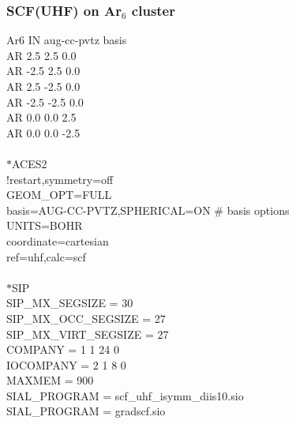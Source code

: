 \documentclass[12pt]{article}
\begin{document}
\subsubsection{SCF(UHF) on Ar$_6$ cluster} 
Ar6 IN aug-cc-pvtz basis\\ 
AR  2.5  2.5  0.0\\ 
AR -2.5  2.5  0.0\\ 
AR  2.5 -2.5  0.0\\ 
AR -2.5 -2.5  0.0\\ 
AR  0.0  0.0  2.5\\ 
AR  0.0  0.0 -2.5\\ 
\\ 
$*$ACES2\\ 
!restart,symmetry=off\\ 
GEOM\_OPT=FULL\\ 
basis=AUG-CC-PVTZ,SPHERICAL=ON \# basis options\\ 
UNITS=BOHR\\ 
coordinate=cartesian\\
ref=uhf,calc=scf\\ 
\\ 
$*$SIP\\ 
SIP\_MX\_SEGSIZE      = 30\\ 
SIP\_MX\_OCC\_SEGSIZE  = 27\\ 
SIP\_MX\_VIRT\_SEGSIZE = 27\\
COMPANY   = 1 1 24 0\\
IOCOMPANY = 2 1  8 0\\
MAXMEM    = 900\\
SIAL\_PROGRAM = scf\_uhf\_isymm\_diis10.sio\\ 
SIAL\_PROGRAM = gradscf.sio\\ 
\\

\newpage 

\noindent 
\end{document}
